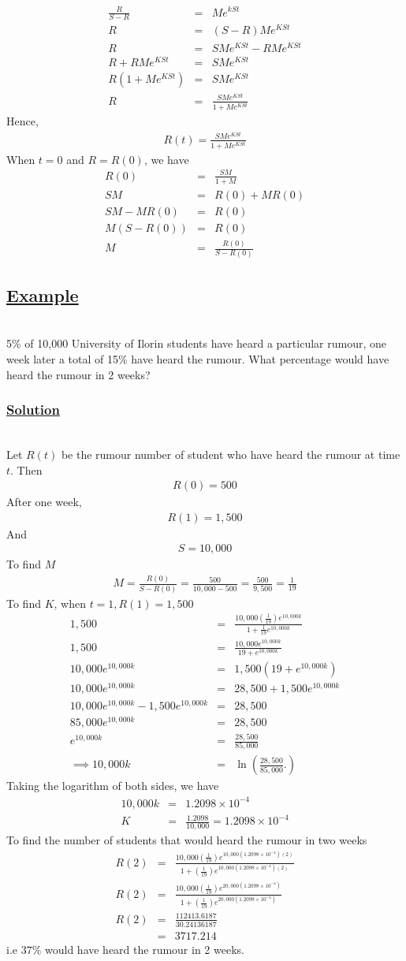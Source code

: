 \documentclass[11pt]{report}
\newcommand{\ubt}[1]{\textbf{\underline{#1}}}
\newcommand{\sps}{\\[0.2cm]}
\newcommand{\spn}[1]{\\[#1cm]}
\newcommand{\solution}{\subsubsection{\ubt{Solution}}{~}\spn{-1}}
\newcommand{\eg}{\subsection*{\ubt{Example}}{~}\spn{-1}}
\begin{document}
	\begin{eqnarray*}
		\frac{R}{S-R} &=& Me^{kSt}\sps
		R &=& (S-R)Me^{KSt}\sps
		R &=& SMe^{KSt} - RMe^{KSt}\sps
		R + RMe^{KSt} &=& SMe^{KSt}\sps
		R(1+Me^{KSt}) &=& SMe^{KSt}\sps
		R &=& \frac{SMe^{KSt}}{1 + Me^{KSt}}
	\end{eqnarray*}
	Hence,
	\begin{eqnarray}
		R(t) = \frac{SMe^{KSt}}{1 + Me^{KSt}}\label{eq:3_12}
	\end{eqnarray}	
	When $t=0$ and $R=R(0)$, we have
	\begin{eqnarray*}
		R(0) &=& \frac{SM}{1+M}\sps
		SM &=& R(0) + MR(0)\sps
		SM - MR(0) &=& R(0)\sps
		M(S-R(0)) &=& R(0)\sps
		M &=& \frac{R(0)}{S-R(0)}
	\end{eqnarray*}
	
	\eg
	5\% of 10,000 University of Ilorin  students have heard a particular rumour, one week later a total of 15\% have heard the rumour. What percentage would have heard the rumour in 2 weeks?
	
	\solution
	Let $R(t)$ be the rumour number of student who have heard the rumour at time $t$. Then
	\begin{eqnarray*}
		R(0) = 500
	\end{eqnarray*}
	After one week,
	\begin{eqnarray*}
		R(1) = 1,500
	\end{eqnarray*}
	And
	\begin{eqnarray*}
		S = 10,000
	\end{eqnarray*}
	To find $M$
	\begin{eqnarray*}
		M = \frac{R(0)}{S-R(0)} = \frac{500}{10,000 - 500} = \frac{500}{9,500} = \frac{1}{19}
	\end{eqnarray*}
	To find $K$, when $t=1, R(1)=1,500$
	\begin{eqnarray*}
		1,500 &=& \frac{10,000\left(\frac{1}{19}\right)e^{10,000k}}{1 + \frac{1}{19}e^{10,000k}}\sps
		1,500 &=& \frac{10,000e^{10,000k}}{19+e^{10,000k}}\sps
		10,000e^{10,000k} &=& 1,500\left(19+e^{10,000k}\right)\sps
		10,000e^{10,000k} &=& 28,500 + 1,500e^{10,000k}\sps
		10,000e^{10,000k} - 1,500e^{10,000k} &=& 28,500\sps
		85,000e^{10,000k} &=& 28,500\sps
		e^{10,000k} &=& \frac{28,500}{85,000}\sps 
		\implies 10,000k &=& \ln\left(\frac{28,500}{85,000} .\right)
	\end{eqnarray*}
	Taking the logarithm of both sides, we have
	\begin{eqnarray*}
		10,000k &=& 1.2098\times 10^{-4}\sps
		K &=&\frac{1.2098}{10,000} = 1.2098\times10^{-4}
	\end{eqnarray*}
	To find the number of students that would heard the rumour in two weeks
	\begin{eqnarray*}
		R(2) &=& \frac{10,000\left(\frac{1}{19}\right)e^{10,000(1.2098\times10^{-4})(2)}}{1 + \left(\frac{1}{19}\right)e^{10,000(1.2098\times10^{-4})(2)}}\sps
		R(2) &=& \frac{10,000\left(\frac{1}{19}\right)e^{20,000(1.2098\times10^{-4})}}{1 + \left(\frac{1}{19}\right)e^{20,000(1.2098\times10^{-4})}}\sps
		R(2) &=& \frac{112413.6187}{30.24136187}\sps
		&=& 3717.214
	\end{eqnarray*}
	i.e $37\%$ would have heard the rumour in 2 weeks.
\end{document}
